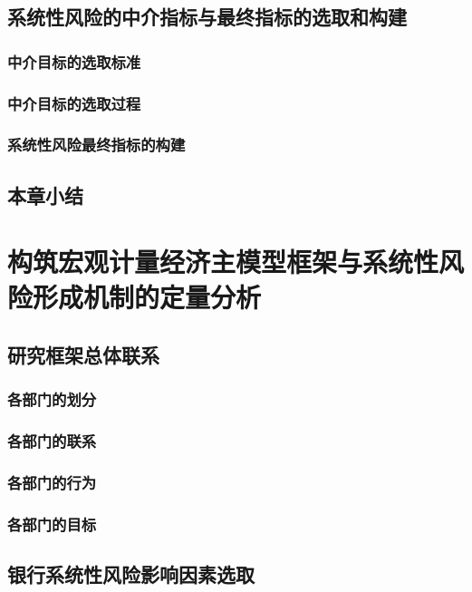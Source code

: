 \newpage
\subsection{系统性风险的中介指标与最终指标的选取和构建}

\subsubsection{中介目标的选取标准}
\subsubsection{中介目标的选取过程}
\subsubsection{系统性风险最终指标的构建}

\newpage
\subsection{本章小结}

\newpage
\section{构筑宏观计量经济主模型框架与系统性风险形成机制的定量分析}

\newpage
\subsection{研究框架总体联系}

\subsubsection{各部门的划分}

\subsubsection{各部门的联系}
\subsubsection{各部门的行为}
\subsubsection{各部门的目标}

\newpage
\subsection{银行系统性风险影响因素选取}

